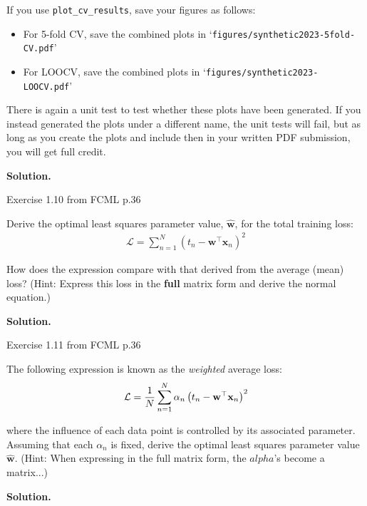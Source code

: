 \documentclass[10pt]{article}
\begin{document}
\begin{itemize}
If you use {\tt plot\_cv\_results}, save your figures as follows:
\begin{itemize}
\item For 5-fold CV, save the combined plots in `{\tt figures/synthetic2023-5fold-CV.pdf}'
\item For LOOCV, save the combined plots in `{\tt figures/synthetic2023-LOOCV.pdf}'
\end{itemize}
There is again a unit test to test whether these plots have been generated. If you instead generated the plots under a different name, the unit tests will fail, but as long as you create the plots and include then in your written PDF submission, you will get full credit.

{\bf Solution.}
\vspace{15pt}




{\bf \large \item[4.] [2 points -- Required only for Graduates]

Exercise 1.10 from FCML p.36}

\normalsize Derive the optimal least squares parameter value, $\mathbf{\hat{w}}$, for the total training loss:
\begin{eqnarray*}
\mathcal{L} = \sum_{n=1}^N \left( t_n - \mathbf{w}^\top \mathbf{x}_n \right)^2
\end{eqnarray*}

How does the expression compare with that derived from the average (mean) loss?  (Hint: Express this loss in the {\bf full} matrix form and derive the normal equation.)

{\bf Solution.}
\vspace{15pt}




{\bf \large \item[5.] [3 points -- Required only for Graduates]

Exercise 1.11 from FCML p.36}

\normalsize

The following expression is known as the {\em weighted} average loss:
\begin{eqnarray*}
\mathcal{L} = {1 \over N} \sum_{n=1}^N \alpha_n \left( t_n - \mathbf{w}^\top \mathbf{x}_n \right)^2
\end{eqnarray*}

where the influence of each data point is controlled by its associated parameter.  Assuming that each $\alpha_n$ is fixed, derive the optimal least squares parameter value $\mathbf{\hat{w}}$.  (Hint: When expressing in the full matrix form, the $alpha$'s become a matrix...)

{\bf Solution.}
\vspace{15pt}



\end{itemize}
\end{document}
